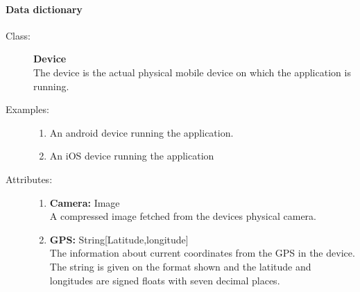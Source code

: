 \documentclass[10pt,a4paper]{article}
\begin{document}
\paragraph{Data dictionary}

%
%
%

\begin{description}
\item[Class:] \textbf{Device} \hfill \\
The device is the actual physical mobile device on which the application is running.

\item[Examples:] \hfill
\begin{enumerate}
\item An android device running the application.
\item An iOS device running the application
\end{enumerate}

\item[Attributes:] \hfill
\begin{enumerate}
\item \textbf{Camera:} Image \hfill \\A compressed image fetched from the devices physical camera.
\item \textbf{GPS:} String[Latitude,longitude] \hfill \\The information about current coordinates from the GPS in the device. The string is given on the format shown and the latitude and longitudes are signed floats with seven decimal places.
\end{enumerate}
\end{description}
\end{document}
